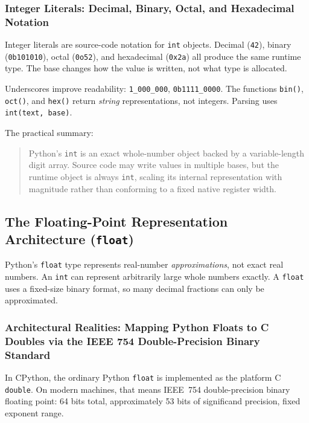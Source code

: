 \documentclass[a4paper,twoside]{report}
\begin{document}
\subsubsection{Integer Literals: Decimal, Binary, Octal, and Hexadecimal Notation}

Integer literals are source-code notation for \texttt{int} objects. Decimal (\texttt{42}), binary (\texttt{0b101010}), octal (\texttt{0o52}), and hexadecimal (\texttt{0x2a}) all produce the same runtime type. The base changes how the value is written, not what type is allocated.

Underscores improve readability: \texttt{1\_000\_000}, \texttt{0b1111\_0000}. The functions \texttt{bin()}, \texttt{oct()}, and \texttt{hex()} return \emph{string} representations, not integers. Parsing uses \texttt{int(text, base)}.

The practical summary:

\begin{quote}
Python's \texttt{int} is an exact whole-number object backed by a variable-length digit array. Source code may write values in multiple bases, but the runtime object is always \texttt{int}, scaling its internal representation with magnitude rather than conforming to a fixed native register width.
\end{quote}


\subsection{The Floating-Point Representation Architecture (\texttt{float})}

Python's \texttt{float} type represents real-number \emph{approximations}, not exact real numbers. An \texttt{int} can represent arbitrarily large whole numbers exactly. A \texttt{float} uses a fixed-size binary format, so many decimal fractions can only be approximated.

\subsubsection{Architectural Realities: Mapping Python Floats to C Doubles via the IEEE 754 Double-Precision Binary Standard}

In CPython, the ordinary Python \texttt{float} is implemented as the platform C \texttt{double}. On modern machines, that means IEEE~754 double-precision binary floating point: 64 bits total, approximately 53 bits of significand precision, fixed exponent range.
\end{document}
